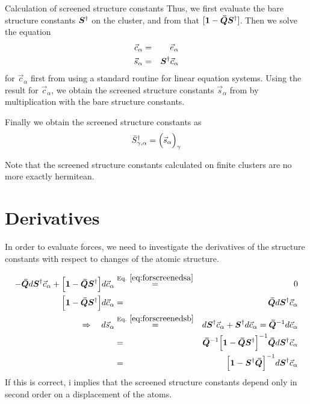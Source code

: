 \documentclass[11pt,a4paper]{report}
\begin{document}
\begin{myshadowminipage}{Calculation of screened structure constants}
Thus, we first evaluate the bare structure constants $\bm{S}^\dagger$
on the cluster, and from that
$[\bm{1}-\bm{\bar{Q}}\bm{S}^\dagger]$. Then we solve the equation
\begin{eqnarray}
[\mat{1}-\mat{\bar{Q}}\mat{S}^\dagger]\vec{c}_\alpha&=&\vec{e}_\alpha
\label{eq:forscreenedsa}
\\
\vec{s}_\alpha&=&\mat{S}^\dagger\vec{c}_\alpha
\label{eq:forscreenedsb}
\end{eqnarray}
for $\vec{c}_\alpha$ first from  using a standard
routine for linear equation systems. Using the result for
$\vec{c}_\alpha$, we obtain the screened structure constants
$\vec{s}_\alpha$ from  by multiplication with the
bare structure constants.

Finally we obtain the screened structure constants as
\begin{eqnarray}
\bar{S}^\dagger_{\gamma,\alpha}=\Bigl(\vec{s}_\alpha\Bigr)_\gamma
\end{eqnarray}
\end{myshadowminipage}

Note that the screened structure constants calculated on finite
clusters are no more exactly hermitean.

\section{Derivatives}
In order to evaluate forces, we need to investigate the derivatives of
the structure constants with respect to changes of the atomic
structure.

\begin{eqnarray}
-\mat{\bar{Q}}d\mat{S}^\dagger\vec{c}_\alpha
+\Bigl[\mat{1}-\mat{\bar{Q}}\mat{S}^\dagger\Bigr]d\vec{c}_\alpha
&\eqrel{eq:forscreenedsa}{=}&0
\nonumber\\
\Bigl[\mat{1}-\mat{\bar{Q}}\mat{S}^\dagger\Bigr]d\vec{c}_\alpha
&=&
\mat{\bar{Q}}d\mat{S}^\dagger\vec{c}_\alpha
\nonumber\\
\Rightarrow\quad
d\vec{s}_\alpha
&\eqrel{eq:forscreenedsb}{=}&
d\mat{S}^\dagger\vec{c}_\alpha
+\mat{S}^\dagger d\vec{c}_\alpha
=\mat{\bar{Q}}^{-1}d\vec{c}_\alpha
\nonumber\\
&=&\mat{\bar{Q}}^{-1}\Bigl[\mat{1}-\mat{\bar{Q}}\mat{S}^\dagger\Bigr]^{-1}
\mat{\bar{Q}}d\mat{S}^\dagger\vec{c}_\alpha
\nonumber\\
&=&\Bigl[\mat{1}-\mat{S}^\dagger\mat{\bar{Q}}\Bigr]^{-1}
d\mat{S}^\dagger\vec{c}_\alpha
\end{eqnarray}
If this is correct, i implies that the screened structure constants
depend only in second order on a displacement of the atoms.
\end{document}
